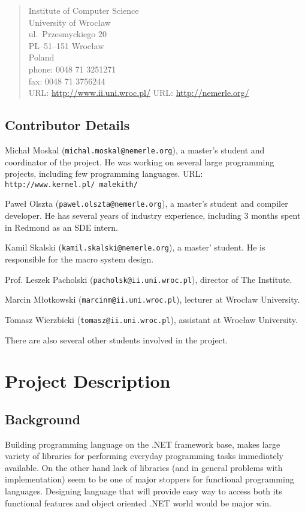 \documentclass[a4paper,11pt]{article}
\begin{document}
\begin{quote}
Institute of Computer Science\\
University of Wroc\l aw\\
ul.\ Przesmyckiego 20\\
PL--51--151 Wroc\l aw\\
Poland\\[2ex]
phone: 0048 71 3251271\\
fax:   0048 71 3756244\\
URL: \url{http://www.ii.uni.wroc.pl/}
URL: \url{http://nemerle.org/}
\end{quote}


\subsection{Contributor Details}

Micha{\l} Moskal (\texttt{michal.moskal@nemerle.org}), a master's
student and coordinator of the project. He was working on several large
programming projects, including few programming languages. URL: 
\texttt{http://www.kernel.pl/~malekith/}

Pawe{\l} Olszta (\texttt{pawel.olszta@nemerle.org}), a master's student
and compiler developer. He has several years of industry experience, 
including 3 months spent in Redmond as an SDE intern. 

Kamil Skalski (\texttt{kamil.skalski@nemerle.org}), a master' student.
He is responsible for the macro system design.

Prof. Leszek Pacholski (\texttt{pacholsk@ii.uni.wroc.pl}), director of The Institute.

Marcin M\l otkowski (\texttt{marcinm@ii.uni.wroc.pl}), lecturer at Wroc\l aw University.

Tomasz Wierzbicki (\texttt{tomasz@ii.uni.wroc.pl}), assistant at Wroc\l aw University.

There are also several other students involved in the project.


\section{Project Description}

\subsection{Background}
Building programming language on the .NET framework base, makes large
variety of libraries for performing everyday programming tasks immediately
available. On the other hand lack of libraries (and in general problems
with implementation) seem to be one of major stoppers for functional
programming languages. Designing language that will provide easy way
to access both its functional features and object oriented .NET world
would be major win.
\end{document}
